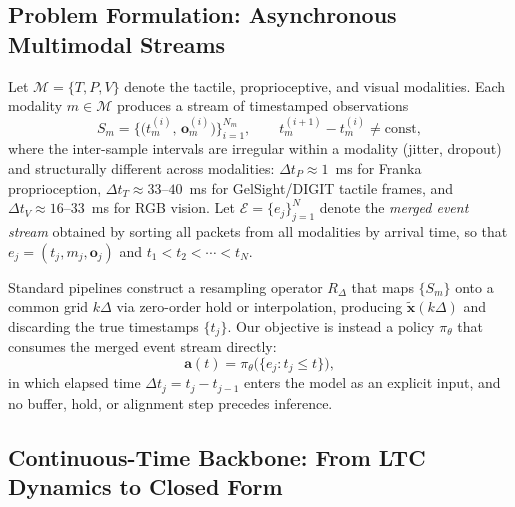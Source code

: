 \documentclass[conference]{IEEEtran}
\begin{document}
\subsection{Problem Formulation: Asynchronous Multimodal Streams}
Let $\mathcal{M} = \{T, P, V\}$ denote the tactile, proprioceptive, and visual modalities. Each modality $m \in \mathcal{M}$ produces a stream of timestamped observations
\begin{equation}\label{eq:stream}
S_m = \bigl\{\bigl(t_m^{(i)},\, \mathbf{o}_m^{(i)}\bigr)\bigr\}_{i=1}^{N_m}, \qquad t_m^{(i+1)} - t_m^{(i)} \neq \mathrm{const},
\end{equation}
where the inter-sample intervals are irregular within a modality (jitter, dropout) and structurally different across modalities: $\Delta t_P \approx 1$~ms for Franka proprioception, $\Delta t_T \approx 33$--$40$~ms for GelSight/DIGIT tactile frames, and $\Delta t_V \approx 16$--$33$~ms for RGB vision. Let $\mathcal{E} = \{e_j\}_{j=1}^{N}$ denote the \emph{merged event stream} obtained by sorting all packets from all modalities by arrival time, so that $e_j = (t_j, m_j, \mathbf{o}_j)$ and $t_1 < t_2 < \cdots < t_N$.

Standard pipelines construct a resampling operator $R_\Delta$ that maps $\{S_m\}$ onto a common grid $k\Delta$ via zero-order hold or interpolation, producing $\tilde{\mathbf{x}}(k\Delta)$ and discarding the true timestamps $\{t_j\}$. Our objective is instead a policy $\pi_\theta$ that consumes the merged event stream directly:
\begin{equation}\label{eq:asyncpolicy}
\mathbf{a}(t) = \pi_\theta\bigl(\{e_j : t_j \le t\}\bigr),
\end{equation}
in which elapsed time $\Delta t_j = t_j - t_{j-1}$ enters the model as an explicit input, and no buffer, hold, or alignment step precedes inference.

\subsection{Continuous-Time Backbone: From LTC Dynamics to Closed Form}
\end{document}
